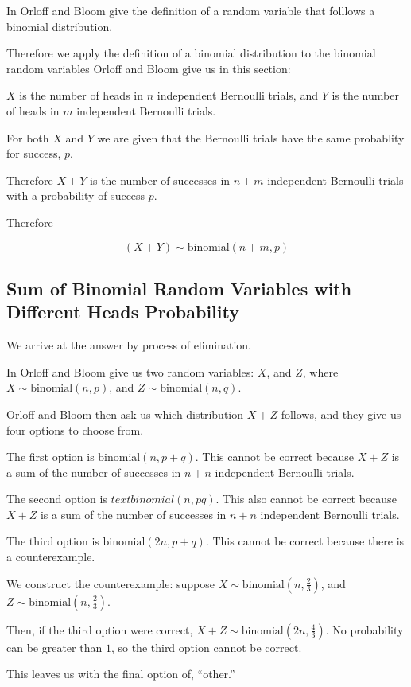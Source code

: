 \documentclass[a4paper,11pt]{article}
\begin{document}
In \cite{reading4} Orloff and Bloom give the definition of a random 
variable that folllows a binomial distribution.

Therefore we apply the definition of a binomial distribution to the
binomial random variables Orloff and Bloom give us in this section:

$X$ is the number of heads in $n$ independent Bernoulli trials, and $Y$
is the number of heads in $m$ independent Bernoulli trials.

For both $X$ and $Y$ we are given that the Bernoulli trials have the
same probablity for success, $p$.

Therefore $X+Y$ is the number of successes in $n+m$ independent
Bernoulli trials with a probability of success $p$.

Therefore 

\begin{equation}
  \left( X + Y \right) \sim \text{binomial} \left( n + m, p \right)
\end{equation}

\subsection{Sum of Binomial Random Variables with Different Heads 
  Probability}

We arrive at the answer by process of elimination. 

In \cite{slides4} Orloff and Bloom give us two random variables: $X$,
and $Z$, where $X \sim \text{binomial} \left( n, p \right)$, and
$Z \sim \text{binomial} \left( n, q \right)$.

Orloff and Bloom then ask us which distribution $X + Z$ follows, and
they give us four options to choose from.  

The first option is $\text{binomial} \left( n, p + q \right)$.  This 
cannot be correct because $X + Z$ is a sum of the number of successes in 
$n + n$ independent Bernoulli trials.

The second option is $text{binomial} \left( n, pq \right)$.  This also
cannot be correct because $X + Z$ is a sum of the number of successes in 
$n + n$ independent Bernoulli trials.

The third option is $\text{binomial} \left( 2n, p + q \right)$.  This
cannot be correct because there is a counterexample.

We construct the counterexample:  suppose 
$X \sim \text{binomial} \left( n, \frac{2}{3} \right)$, and
$Z \sim \text{binomial} \left( n, \frac{2}{3} \right)$.

Then, if the third option were correct, 
$X + Z \sim \text{binomial} \left( 2n, \frac{4}{3} \right)$.  No 
probability can be greater than $1$, so the third option cannot be
correct.

This leaves us with the final option of, ``other.''
 
\printbibliography{}
\end{document}
